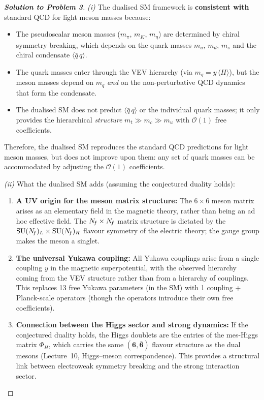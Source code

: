 \documentclass[11pt,a4paper]{article}
\newcommand{\qqbar}{\langle \bar{q}\,q \rangle}
\begin{document}
\begin{proof}[\textbf{Solution to Problem 3}]
\textit{(i)} The dualised SM framework is \textbf{consistent with}
standard QCD for light meson masses because:
\begin{itemize}
  \item The pseudoscalar meson masses ($m_\pi$, $m_K$, $m_\eta$)
    are determined by chiral symmetry breaking, which depends on
    the quark masses $m_u$, $m_d$, $m_s$ and the chiral condensate
    $\qqbar$.
  \item The quark masses enter through the VEV hierarchy (via
    $m_q = y\,\langle H \rangle$), but the meson masses depend on
    $m_q$ \emph{and} on the non-perturbative QCD dynamics that
    form the condensate.
  \item The dualised SM does not predict $\qqbar$ or the
    individual quark masses; it only provides the hierarchical
    \emph{structure} $m_t \gg m_c \gg m_u$ with $\mathcal{O}(1)$
    free coefficients.
\end{itemize}

Therefore, the dualised SM reproduces the standard QCD predictions for
light meson masses, but does not improve upon them: any set of quark
masses can be accommodated by adjusting the $\mathcal{O}(1)$
coefficients.

\textit{(ii)} What the dualised SM adds (assuming the conjectured
duality holds):

\begin{enumerate}
  \item \textbf{A UV origin for the meson matrix structure:}  The
    $6 \times 6$ meson matrix arises as an elementary field in the
    magnetic theory, rather than being an ad hoc effective field.
    The $N_{\!f} \times N_{\!f}$ matrix structure is dictated by the
    $\mathrm{SU}(N_{\!f})_L \times \mathrm{SU}(N_{\!f})_R$ flavour symmetry of the electric
    theory; the gauge group makes the meson a singlet.

  \item \textbf{The universal Yukawa coupling:} All Yukawa couplings
    arise from a single coupling $y$ in the magnetic superpotential,
    with the observed hierarchy coming from the VEV structure rather
    than from a hierarchy of couplings.  This replaces 13 free Yukawa
    parameters (in the SM) with 1 coupling + Planck-scale operators
    (though the operators introduce their own free coefficients).

  \item \textbf{Connection between the Higgs sector and strong
    dynamics:}  If the conjectured duality holds, the Higgs doublets
    are the entries of the mes-Higgs matrix $\Phi_H$, which carries the
    same $(\mathbf{6}, \bar{\mathbf{6}})$ flavour structure as the dual
    mesons (Lecture~10, Higgs--meson correspondence).  This provides a
    structural link between electroweak symmetry breaking and the
    strong interaction sector.
\end{enumerate}

\end{proof}
\end{document}
